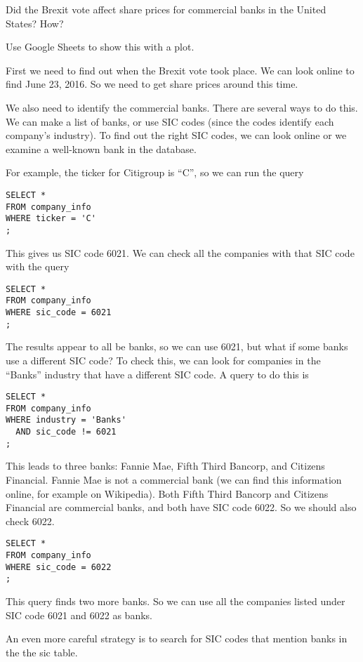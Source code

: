 \documentclass[10pt]{exam}
\begin{document}
\begin{questions}

\question Did the Brexit vote affect share prices for commercial banks in the
United States? How?

Use Google Sheets to show this with a plot.

\begin{solution}
First we need to find out when the Brexit vote took place. We can look online
to find June 23, 2016. So we need to get share prices around this time.

We also need to identify the commercial banks. There are several ways to do
this. We can make a list of banks, or use SIC codes (since the codes identify
each company's industry). To find out the right SIC codes, we can look online
or we examine a well-known bank in the database.

For example, the ticker for Citigroup is ``C'', so we can run the query
\begin{lstlisting}
SELECT *
FROM company_info
WHERE ticker = 'C'
;
\end{lstlisting}
This gives us SIC code 6021. We can check all the companies with that SIC code
with the query
\begin{lstlisting}
SELECT *
FROM company_info
WHERE sic_code = 6021
;
\end{lstlisting}
The results appear to all be banks, so we can use 6021, but what if some banks
use a different SIC code? To check this, we can look for companies in the
``Banks'' industry that have a different SIC code. A query to do this is
\begin{lstlisting}
SELECT *
FROM company_info
WHERE industry = 'Banks'
  AND sic_code != 6021
;
\end{lstlisting}
This leads to three banks: Fannie Mae, Fifth Third Bancorp, and Citizens
Financial. Fannie Mae is not a commercial bank (we can find this information
online, for example on Wikipedia). Both Fifth Third Bancorp and Citizens
Financial are commercial banks, and both have SIC code 6022. So we should also
check 6022.
\begin{lstlisting}
SELECT *
FROM company_info
WHERE sic_code = 6022
;
\end{lstlisting}
This query finds two more banks. So we can use all the companies listed under
SIC code 6021 and 6022 as banks.

An even more careful strategy is to search for SIC codes that mention banks in
the the sic table.


\end{solution}
\end{questions}
\end{document}
